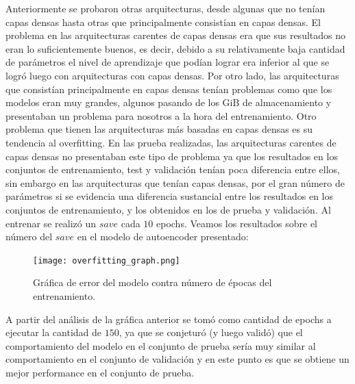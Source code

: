 \documentclass[colorinlistoftodos,twoside,twocolumn,10pt]{article} %
\begin{document}
Anteriormente se probaron otras arquitecturas, desde algunas que no tenían capas densas hasta otras que principalmente consistían en capas densas. El problema en las arquitecturas carentes de capas densas era que sus resultados no eran lo suficientemente buenos, es decir, debido a su relativamente baja cantidad de parámetros el nivel de aprendizaje que podían lograr era inferior al que se logró luego con arquitecturas con capas densas. Por otro lado, las arquitecturas que consistían principalmente en capas densas tenían problemas como que los modelos eran muy grandes, algunos pasando de los GiB de almacenamiento y presentaban un problema para nosotros a la hora del entrenamiento. Otro problema que tienen las arquitecturas más basadas en capas densas es su tendencia al overfitting. En las prueba realizadas, las arquitecturas carentes de capas densas no presentaban este tipo de problema ya que los resultados en los conjuntos de entrenamiento, test y validación tenían poca diferencia entre ellos, sin embargo en las arquitecturas que tenían capas densas, por el gran número de parámetros si se evidencia una diferencia sustancial entre los resultados en los conjuntos de entrenamiento, y los obtenidos en los de prueba y validación. Al entrenar se realizó un $save$ cada $10$ epochs. Veamos los resultados sobre el número del $save$ en el modelo de autoencoder presentado:

\begin{figure}[h!]
	\begin{center}
		\texttt{[image: overfitting\_graph.png]}
		\caption{Gráfica de error del modelo contra número de épocas del entrenamiento.}
	\end{center}
\end{figure}

A partir del análisis de la gráfica anterior se tomó como cantidad de epochs a ejecutar la cantidad de $150$, ya que se conjeturó (y luego validó) que el comportamiento del modelo en el conjunto de prueba sería muy similar al comportamiento en el conjunto de validación y en este punto es que se obtiene un mejor performance en el conjunto de prueba. 
\end{document}
